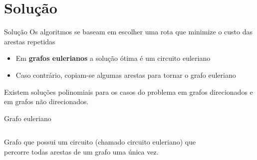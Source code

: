 \documentclass{beamer}
\begin{document}
\section{Solução}

\begin{frame}{Solução}
    Os algoritmos se baseam em escolher uma rota que minimize o custo das arestas repetidas
    \begin{itemize}
        \item Em \textbf{grafos eulerianos} a solução ótima é um circuito euleriano
        \item Caso contrário, copiam-se algumas arestas para tornar o grafo euleriano
    \end{itemize}

    Existem soluções polinomiais para os casos do problema em grafos direcionados e em grafos não direcionados.

    \vspace{10px}

    \begin{block}{Grafo euleriano}
        \begin{columns}
                Grafo que possui um circuito (chamado circuito euleriano) que percorre todas arestas de um grafo uma única vez. 


            \begin{figure}
                \centering
            \end{figure}

            \vspace{6px}
            
        \end{columns} 
    \end{block}

\end{frame}
\end{document}
